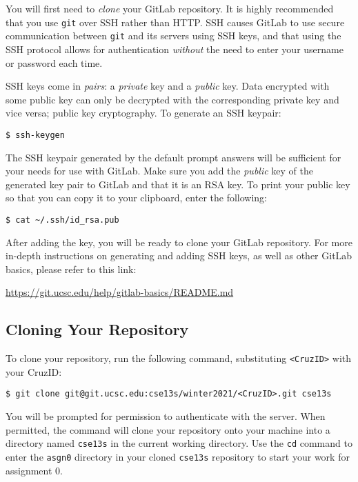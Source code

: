 \documentclass[11pt]{article}
\begin{document}
You will first need to \emph{clone} your GitLab repository. It is highly
recommended that you use \texttt{git} over SSH rather than HTTP.  SSH causes
GitLab to use secure communication between \texttt{git} and its servers using
SSH keys, and that using the SSH protocol allows for authentication
\emph{without} the need to enter your username or password each time.

SSH keys come in \emph{pairs}: a \emph{private} key and a \emph{public} key.
Data encrypted with some public key can only be decrypted with the corresponding
private key and vice versa; public key cryptography. To generate an SSH keypair:

\begin{lstlisting}[style=bashstyle]
  $ ssh-keygen
\end{lstlisting}

The SSH keypair generated by the default prompt answers will be sufficient for
your needs for use with GitLab. Make sure you add the \emph{public} key of the
generated key pair to GitLab and that it is an RSA key. To print your public key
so that you can copy it to your clipboard, enter the following:

\begin{lstlisting}[style=bashstyle]
  $ cat ~/.ssh/id_rsa.pub
\end{lstlisting}

After adding the key, you will be ready to clone your GitLab repository. For
more in-depth instructions on generating and adding SSH keys, as well as other
GitLab basics, please refer to this link:

\centerline{\url{https://git.ucsc.edu/help/gitlab-basics/README.md}}

\subsection{Cloning Your Repository}

To clone your repository, run the following command, substituting
\texttt{<CruzID>} with your CruzID:

\begin{lstlisting}[style=bashstyle]
  $ git clone git@git.ucsc.edu:cse13s/winter2021/<CruzID>.git cse13s
\end{lstlisting}

You will be prompted for permission to authenticate with the server.
When permitted, the command will clone your repository onto your machine into a
directory named \texttt{cse13s} in the current working directory. Use the
\texttt{cd} command to enter the \texttt{asgn0} directory in your cloned
\texttt{cse13s} repository to start your work for assignment 0.
\end{document}
